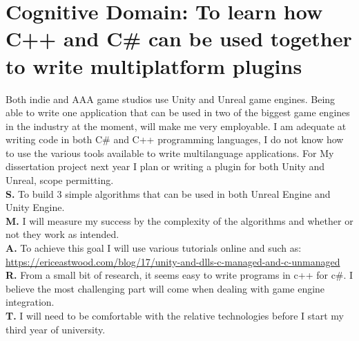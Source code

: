 \documentclass{scrartcl}
\begin{document}
\section{Cognitive Domain: To learn how C++ and C\#  can be used together to write multiplatform plugins}
Both indie and AAA game studios use Unity and Unreal game engines. Being able to write one application that can be used in two of the biggest game engines in the industry at the moment, will make me very employable. 
I am adequate at writing code in both C\# and C++ programming languages, I do not know how to use the various tools available to write multilanguage applications. For My dissertation project next year I plan or writing a plugin for
both Unity and Unreal, scope permitting.\\
\textbf{S.} To build 3 simple algorithms that can be used in both Unreal Engine and Unity Engine.\\
\textbf{M.} I will measure my success by the complexity of the algorithms and whether or not they work as intended.\\
\textbf{A.} To achieve this goal I will use various tutorials online and such as:
 \href{url}{https://ericeastwood.com/blog/17/unity-and-dlls-c-managed-and-c-unmanaged}\\
\textbf{R.} From a small bit of research, it seems easy to write programs in c++ for c\#. I believe the most challenging part will come when dealing with game engine integration.\\
\textbf{T.} I will need to be comfortable with the relative technologies before I start my third year of university. \\
\end{document}
